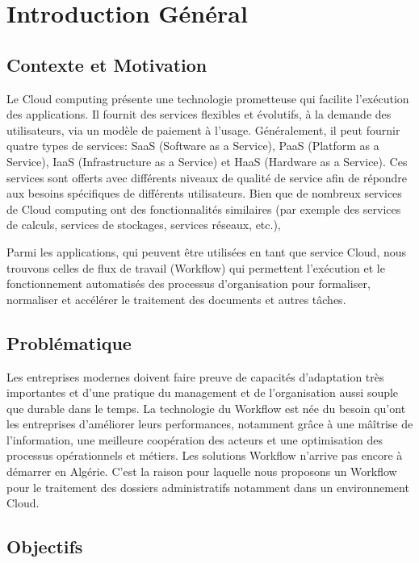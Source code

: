 \chapter*{Introduction Général }


\section*{Contexte et Motivation} 
Le Cloud computing  présente une technologie prometteuse qui facilite l'exécution des applications. Il fournit des services flexibles et évolutifs, à la demande des utilisateurs, via un modèle de paiement à l'usage. Généralement, il peut fournir quatre types de services: SaaS (Software as a Service), PaaS (Platform as a Service), IaaS (Infrastructure as a Service) et HaaS (Hardware as a Service). Ces services sont offerts avec différents niveaux de qualité de service afin de répondre aux besoins spécifiques de différents utilisateurs. Bien que de nombreux services de Cloud computing  ont des fonctionnalités similaires (par exemple des services de calculs, services de stockages, services  réseaux, etc.),

Parmi les  applications, qui peuvent être  utilisées en tant que service Cloud, nous trouvons celles de flux de travail (Workflow)  qui permettent l'exécution et le fonctionnement automatisés des processus d'organisation pour formaliser, normaliser et accélérer le traitement des documents et autres tâches.




\section*{Problématique}

Les entreprises modernes doivent faire preuve de capacités d'adaptation très importantes et d'une pratique du management et de l'organisation aussi souple que durable dans le temps.  La technologie du Workflow est née du besoin qu'ont les entreprises d'améliorer leurs performances, notamment grâce à une mâîtrise de l'information, une meilleure coopération des acteurs et une optimisation des processus opérationnels et métiers. Les solutions Workflow n’arrive pas encore à démarrer en Algérie. C’est la raison pour laquelle nous  proposons un Workflow pour le traitement des dossiers administratifs notamment dans un environnement Cloud.


 
\section*{Objectifs}


